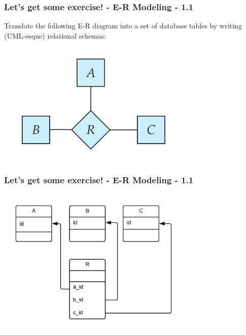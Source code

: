 \begin{frame}
\frametitle{Let's get some exercise! - E-R Modeling - 1.1}

Translate the following E-R diagram into a set of database tables by writing (UML-esque) relational schemas:

\begin{center}
  \includegraphics[width=0.7\textwidth]{images/ternary-relationship.png}
\end{center}

\end{frame}


\begin{frame}
\frametitle{Let's get some exercise! - E-R Modeling - 1.1}

\begin{center}
  \includegraphics[width=0.7\textwidth]{images/1-1.png}
\end{center}


\end{frame}


